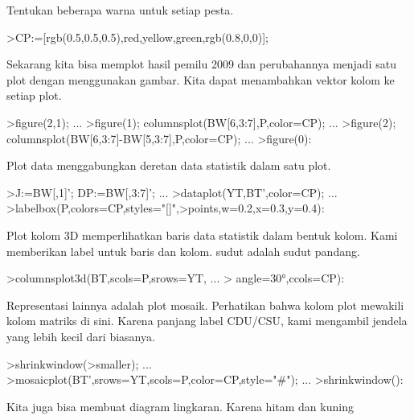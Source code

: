\documentclass{article}
\begin{document}
\begin{eulernotebook}
\begin{eulercomment}
\begin{eulercomment}
\begin{eulercomment}
Tentukan beberapa warna untuk setiap pesta.
\end{eulercomment}
\begin{eulerprompt}
>CP:=[rgb(0.5,0.5,0.5),red,yellow,green,rgb(0.8,0,0)];
\end{eulerprompt}
\begin{eulercomment}
Sekarang kita bisa memplot hasil pemilu 2009 dan perubahannya menjadi
satu plot dengan menggunakan gambar. Kita dapat menambahkan vektor
kolom ke setiap plot.
\end{eulercomment}
\begin{eulerprompt}
>figure(2,1);  ...
>figure(1); columnsplot(BW[6,3:7],P,color=CP); ...
>figure(2); columnsplot(BW[6,3:7]-BW[5,3:7],P,color=CP);  ...
>figure(0):
\end{eulerprompt}
\begin{eulercomment}
Plot data menggabungkan deretan data statistik dalam satu plot.
\end{eulercomment}
\begin{eulerprompt}
>J:=BW[,1]'; DP:=BW[,3:7]'; ...
>dataplot(YT,BT',color=CP);  ...
>labelbox(P,colors=CP,styles="[]",>points,w=0.2,x=0.3,y=0.4):
\end{eulerprompt}
\begin{eulercomment}
Plot kolom 3D memperlihatkan baris data statistik dalam bentuk kolom.
Kami memberikan label untuk baris dan kolom. sudut adalah sudut
pandang.
\end{eulercomment}
\begin{eulerprompt}
>columnsplot3d(BT,scols=P,srows=YT, ...
>  angle=30°,ccols=CP):
\end{eulerprompt}
\begin{eulercomment}
Representasi lainnya adalah plot mosaik. Perhatikan bahwa kolom plot
mewakili kolom matriks di sini. Karena panjang label CDU/CSU, kami
mengambil jendela yang lebih kecil dari biasanya.
\end{eulercomment}
\begin{eulerprompt}
>shrinkwindow(>smaller);  ...
>mosaicplot(BT',srows=YT,scols=P,color=CP,style="#"); ...
>shrinkwindow():
\end{eulerprompt}
\begin{eulercomment}
Kita juga bisa membuat diagram lingkaran. Karena hitam dan kuning

\end{eulercomment}
\end{eulercomment}
\end{eulercomment}
\end{eulernotebook}
\end{document}
